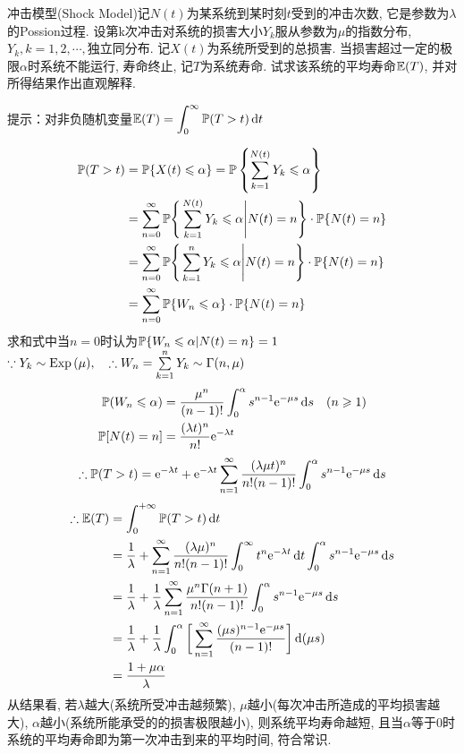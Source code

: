 \begin{problem}{2.11}
冲击模型(Shock Model)记$N(t)$为某系统到某时刻$t$受到的冲击次数, 它是参数为$\lambda$的Possion过程. 设第k次冲击对系统的损害大小$Y_k$服从参数为$\mu$的指数分布, $Y_k, k = 1, 2, \cdots, $独立同分布. 记$X(t)$为系统所受到的总损害. 当损害超过一定的极限$\alpha$时系统不能运行, 寿命终止, 记$T$为系统寿命. 试求该系统的平均寿命$\mathbb{E}(T)$, 并对所得结果作出直观解释.
\par 提示：对非负随机变量$\displaystyle \mathbb{E}(T) = \int^{\infty}_0 \mathbb{P}(T>t)\mathop{}\!\mathrm{d} t$\\
\end{problem}
\begin{solution}[1]
	\[\begin{split}
			\mathbb{P}(T>t) & = \mathbb{P}\{X(t) \leqslant \alpha\} = \mathbb{P}\left\{\sum^{N(t)}_{k=1}Y_k \leqslant \alpha \right\}\\
			& = \sum^{\infty}_{n=0}\mathbb{P}\Bigg\{\sum^{N(t)}_{k=1}Y_k \leqslant \alpha \Bigg| N(t) = n\Bigg\} \cdot \mathbb{P}\{N(t) = n\}\\
			& = \sum^{\infty}_{n=0}\mathbb{P}\Bigg\{\sum^n_{k=1}Y_k \leqslant \alpha \Bigg| N(t) = n\Bigg\} \cdot \mathbb{P}\{N(t) = n\}\\
			& = \sum^{\infty}_{n=0}\mathbb{P}\{W_n \leqslant \alpha\} \cdot \mathbb{P}\{N(t) = n\}\\
		\end{split}\]
	求和式中当$n=0$时认为$\mathbb{P}\{W_n \leqslant \alpha | N(t) = n\} = 1$\\
	$\because Y_k \sim \text{Exp}\,(\mu),\quad \therefore W_n = \sum\limits^n_{k=1}Y_k \sim \Gamma(n,\mu)$
	\[\begin{split}
			\mathbb{P}(W_n \leqslant \alpha) & = \frac{\mu^n}{(n-1)!}\int^\alpha_0s^{n-1}\mathrm{e}^{-\mu s}\mathop{}\!\mathrm{d} s\quad (n\geqslant 1)\\
			\mathbb{P}[N(t) = n] & = \frac{(\lambda t)^n}{n!}\mathrm{e}^{-\lambda t}
		\end{split}\]
	\[\therefore \mathbb{P}(T>t) = \mathrm{e}^{-\lambda t} + \mathrm{e}^{-\lambda t}\sum^{\infty}_{n=1}\frac{(\lambda\mu t)^n}{n!(n-1)!}\int^\alpha_0 s^{n-1}\mathrm{e}^{-\mu s}\mathop{}\!\mathrm{d} s\]
	\[\begin{split}
			\therefore \mathbb{E}(T) & = \int^{+\infty}_0 \mathbb{P}(T>t)\mathop{}\!\mathrm{d} t\\
			& = \frac{1}{\lambda} + \sum^{\infty}_{n=1}\frac{(\lambda\mu)^n}{n!(n-1)!}\int^{\infty}_0 t^n \mathrm{e}^{-\lambda t}\mathop{}\!\mathrm{d} t\int^\alpha_0 s^{n-1}\mathrm{e}^{-\mu s}\mathop{}\!\mathrm{d} s\\
			& = \frac{1}{\lambda} + \frac{1}{\lambda}\sum^{\infty}_{n=1}\frac{\mu^n\Gamma(n+1)}{n!(n-1)!}\int^\alpha_0 s^{n-1}\mathrm{e}^{-\mu s}\mathop{}\!\mathrm{d} s\\
			& = \frac{1}{\lambda} + \frac{1}{\lambda}\int^\alpha_0 \bigg[\sum^{\infty}_{n=1}\frac{(\mu s)^{n-1}\mathrm{e}^{-\mu s}}{(n-1)!}\bigg]\mathop{}\!\mathrm{d} (\mu s)\\
			& = \frac{1+\mu\alpha}{\lambda}
		\end{split}\]
	从结果看, 若$\lambda$越大(系统所受冲击越频繁), $\mu$越小(每次冲击所造成的平均损害越大), $\alpha$越小(系统所能承受的的损害极限越小), 则系统平均寿命越短, 且当$\alpha$等于$0$时系统的平均寿命即为第一次冲击到来的平均时间, 符合常识.
\end{solution}
